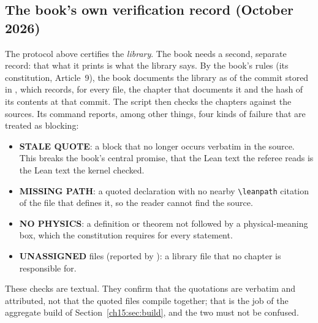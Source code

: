 \subsection{The book's own verification record (October 2026)}\label{ch15:sec:bookrecord}

The protocol above certifies the \emph{library}. The book needs a second, separate record: that what it prints is what
the library says. By the book's rules (its constitution, Article~9), the book documents the library as of the commit
stored in , which records, for every  file, the chapter that
documents it and the hash of its contents at that commit. The script  then checks the
chapters against the sources. Its  command reports, among other things, four kinds of failure that are
treated as blocking:
\begin{itemize}
\item \textbf{STALE QUOTE}: a  block that no longer occurs verbatim in the source. This breaks the book's
  central promise, that the Lean text the referee reads is the Lean text the kernel checked.
\item \textbf{MISSING PATH}: a quoted declaration with no nearby \texttt{\textbackslash leanpath} citation of the file that defines it, so
  the reader cannot find the source.
\item \textbf{NO PHYSICS}: a definition or theorem not followed by a physical-meaning box, which the constitution requires
  for every statement.
\item \textbf{UNASSIGNED} files (reported by ): a library file that no chapter is responsible for.
\end{itemize}
These checks are textual. They confirm that the quotations are verbatim and attributed, not that the quoted files
compile together; that is the job of the aggregate build of Section~\ref{ch15:sec:build}, and the two must not be
confused.

